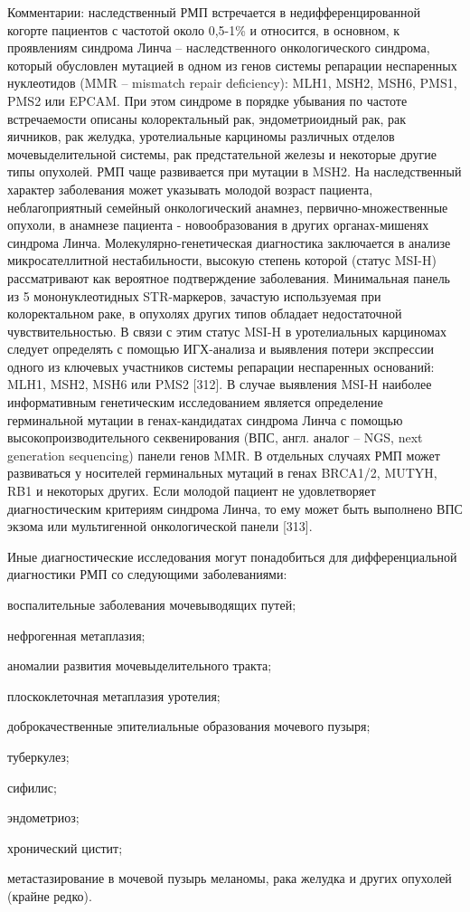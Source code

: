 Комментарии: наследственный РМП встречается в недифференцированной когорте пациентов с частотой около 0,5-1\% и относится, в основном, к проявлениям синдрома Линча – наследственного онкологического синдрома, который обусловлен мутацией в одном из генов системы репарации неспаренных нуклеотидов (MMR – mismatch repair deficiency): MLH1, MSH2, MSH6, PMS1, PMS2 или EPCAM. При этом синдроме в порядке убывания по частоте встречаемости описаны колоректальный рак, эндометриоидный рак, рак яичников, рак желудка, уротелиальные карциномы различных отделов мочевыделительной системы, рак предстательной железы и некоторые другие типы опухолей. РМП чаще развивается при мутации в MSH2. На наследственный характер заболевания может указывать молодой возраст пациента, неблагоприятный семейный онкологический анамнез, первично-множественные опухоли, в анамнезе пациента - новообразования в других органах-мишенях синдрома Линча. Молекулярно-генетическая диагностика заключается в анализе микросателлитной нестабильности, высокую степень которой (статус MSI-H) рассматривают как вероятное подтверждение заболевания. Минимальная панель из 5 мононуклеотидных STR-маркеров, зачастую используемая при колоректальном раке, в опухолях других типов обладает недостаточной чувствительностью. В связи с этим статус MSI-H в уротелиальных карциномах следует определять с помощью ИГХ-анализа и выявления потери экспрессии одного из ключевых участников системы репарации неспаренных оснований: MLH1, MSH2, MSH6 или PMS2 [312]. В случае выявления MSI-H наиболее информативным генетическим исследованием является определение герминальной мутации в генах-кандидатах синдрома Линча с помощью высокопроизводительного секвенирования (ВПС, англ. аналог – NGS, next generation sequencing) панели генов MMR. В отдельных случаях РМП может развиваться у носителей герминальных мутаций в генах BRCA1/2, MUTYH, RB1 и некоторых других. Если молодой пациент не удовлетворяет диагностическим критериям синдрома Линча, то ему может быть выполнено ВПС экзома или мультигенной онкологической панели [313].

Иные диагностические исследования могут понадобиться для дифференциальной диагностики РМП со следующими заболеваниями:

воспалительные заболевания мочевыводящих путей;

нефрогенная метаплазия;

аномалии развития мочевыделительного тракта;

плоскоклеточная метаплазия уротелия;

доброкачественные эпителиальные образования мочевого пузыря;

туберкулез;

сифилис;

эндометриоз;

хронический цистит;

метастазирование в мочевой пузырь меланомы, рака желудка и других опухолей (крайне редко).


